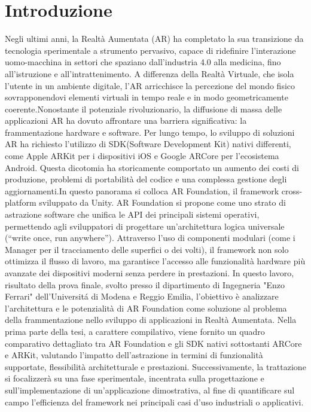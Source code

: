 \chapter{Introduzione}
Negli ultimi anni, la Realtà Aumentata (AR) ha completato la sua transizione da tecnologia sperimentale a strumento pervasivo, capace di ridefinire l'interazione uomo-macchina in settori che spaziano dall'industria 4.0 alla medicina, fino all'istruzione e all'intrattenimento. A differenza della Realtà Virtuale, che isola l'utente in un ambiente digitale, l'AR arricchisce la percezione del mondo fisico sovrapponendovi elementi virtuali in tempo reale e in modo geometricamente coerente.Nonostante il potenziale rivoluzionario, la diffusione di massa delle applicazioni AR ha dovuto affrontare una barriera significativa: la frammentazione hardware e software. Per lungo tempo, lo sviluppo di soluzioni AR ha richiesto l'utilizzo di SDK(Software Development Kit) nativi differenti, come Apple ARKit per i dispositivi iOS e Google ARCore per l'ecosistema Android. Questa dicotomia ha storicamente comportato un aumento dei costi di produzione, problemi di portabilità del codice e una complessa gestione degli aggiornamenti.In questo panorama si colloca AR Foundation, il framework cross-platform sviluppato da Unity. AR Foundation si propone come uno strato di astrazione software che unifica le API dei principali sistemi operativi, permettendo agli sviluppatori di progettare un'architettura logica universale (“write once, run anywhere”). Attraverso l'uso di componenti modulari (come i Manager per il tracciamento delle superfici o dei volti), il framework non solo ottimizza il flusso di lavoro, ma garantisce l'accesso alle funzionalità hardware più avanzate dei dispositivi moderni senza perdere in prestazioni.
In questo lavoro, risultato della prova finale, svolto presso il dipartimento di Ingegneria "Enzo Ferrari" dell'Universitá di Modena e Reggio Emilia, l'obiettivo è analizzare l'architettura e le potenzialità di AR Foundation come soluzione al problema della frammentazione nello sviluppo di applicazioni in Realtà Aumentata. Nella prima parte della tesi, a carattere compilativo, viene fornito un quadro comparativo dettagliato tra AR Foundation e gli SDK nativi sottostanti ARCore e ARKit, valutando l'impatto dell'astrazione in termini di funzionalità supportate, flessibilità architetturale e prestazioni. Successivamente, la trattazione si focalizzerà su una fase sperimentale, incentrata sulla progettazione e sull'implementazione di un'applicazione dimostrativa, al fine di quantificare sul campo l'efficienza del framework nei principali casi d'uso industriali o applicativi.